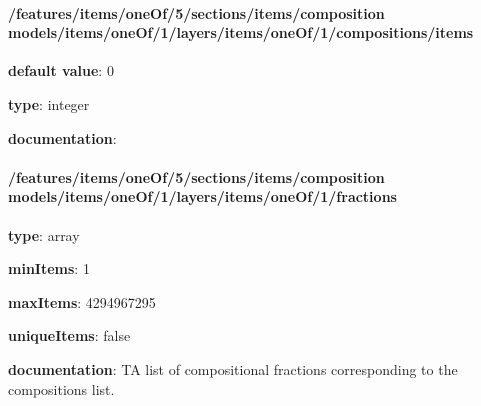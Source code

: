 \begin{itemized}
\paragraph{/features/items/oneOf/5/sections/items/composition models/items/oneOf/1/layers/items/oneOf/1/compositions/items} \begin{itemized}
\item {\bf default value}: 0
\item {\bf type}: integer
\item {\bf documentation}: 
\end{itemized}\end{itemized}\paragraph{/features/items/oneOf/5/sections/items/composition models/items/oneOf/1/layers/items/oneOf/1/fractions} \begin{itemized}
\item {\bf type}: array
\item {\bf minItems}: 1
\item {\bf maxItems}: 4294967295
\item {\bf uniqueItems}: false
\item {\bf documentation}: TA list of compositional fractions corresponding to the compositions list.

\end{itemized}
